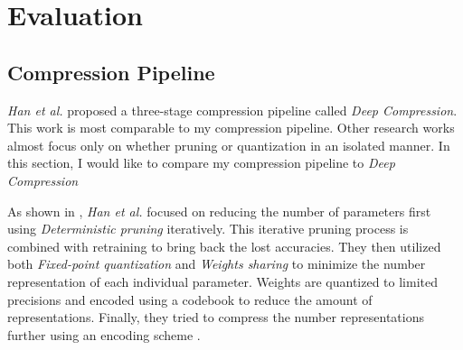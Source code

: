 \documentclass[a4paper,12pt]{report}
\begin{document}
\chapter{Evaluation}
\section{Compression Pipeline}
\textit{Han et al.} proposed a three-stage compression pipeline called
\textit{Deep Compression}.
This work is most comparable to my compression pipeline.
Other research works almost focus only on whether pruning or quantization in an
isolated manner.
In this section, I would like to compare my compression pipeline to \textit{Deep Compression}

As shown in , \textit{Han et al.} focused on
reducing the number of parameters first using \textit{Deterministic pruning} iteratively.
This iterative pruning process is combined with retraining to bring back the lost
accuracies.
They then utilized both \textit{Fixed-point quantization} and \textit{Weights sharing}
to minimize the number representation of each individual parameter.
Weights are quantized to limited precisions and encoded using a codebook
to reduce the amount of representations.
Finally, they tried to compress the number representations further using an
encoding scheme \cite{Han15}.
\end{document}
